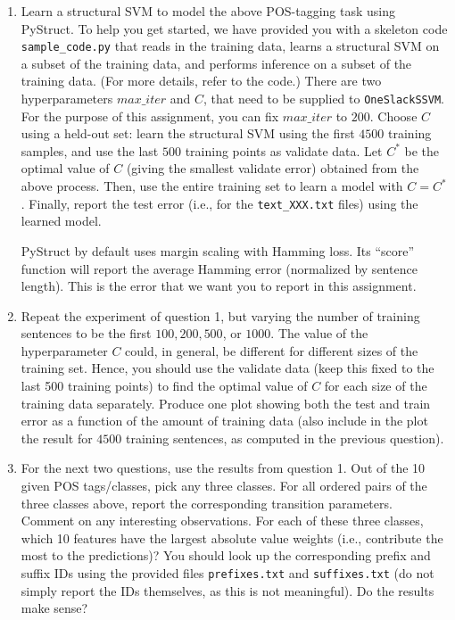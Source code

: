 \documentclass{article}
\begin{document}
\begin{enumerate}
\item Learn a structural SVM to model the above POS-tagging task using PyStruct. To help
you get started, we have provided you with a skeleton code \texttt{sample\_code.py} that reads
in the training data, learns a structural SVM on a subset of the training data, and performs inference on a subset of the training data. 
(For more details, refer to the code.) There
are two hyperparameters $max\_iter$ and $C$, that need to be supplied to
 \texttt{OneSlackSSVM}. For the purpose of this assignment, you can fix $max\_iter$ to $200$.
Choose $C$ using a held-out set: learn the structural SVM using the first $4500$ training samples,
and use the last $500$ training points as validate data. Let $C^*$ be the optimal
value of $C$ (giving the smallest validate error) obtained from the above process. Then, use the
entire training set to learn a model with $C=C^*$. Finally, report the test error (i.e., for the \texttt{text\_XXX.txt} files) using the learned model.

PyStruct by default uses margin scaling with Hamming loss. Its ``score'' function will report the average Hamming error (normalized by sentence length). This is the error that we want you to report in this assignment.

\item 
Repeat the experiment of question 1, but varying the number of training sentences to be the first $ 100, 200, 500$, or $1000$. The value of the hyperparameter $C$ could, in general, be different for different sizes of the training set. Hence, you should use the validate data (keep this fixed to the last 500 training points) to find the optimal value of $C$ for each size of the training data separately. Produce one plot showing both the test and train error as a function of the amount of training data (also include in the plot the result for $4500$ training sentences, as computed in the previous question).

\item For the next two questions, use the results from question 1. Out of the 10 given POS tags/classes, pick any three classes. For all ordered pairs of the three classes above, report the corresponding 
transition parameters. Comment on any interesting observations. 
For each of these three classes, which 10 features have the largest absolute value weights (i.e., contribute the most to the predictions)? You should look up the corresponding prefix and suffix IDs using the provided files \texttt{prefixes.txt} and \texttt{suffixes.txt} (do not simply report the IDs themselves, as this is not meaningful). Do the results make sense?


\end{enumerate}
\end{document}
